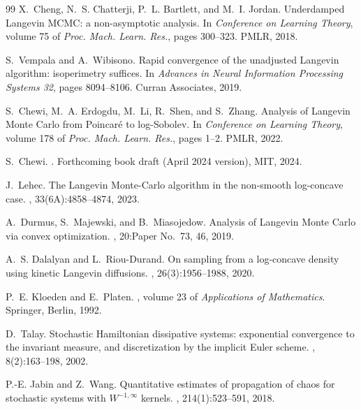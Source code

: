 \documentclass[11pt]{article}
\theoremstyle{definition}
\begin{document}
\begin{thebibliography}{99}
X.~Cheng, N.~S. Chatterji, P.~L. Bartlett, and M.~I. Jordan.
\newblock Underdamped {L}angevin {MCMC}: a non-asymptotic analysis.
\newblock In {\em Conference on Learning Theory}, volume 75 of {\em Proc. Mach. Learn. Res.}, pages 300--323. PMLR, 2018.

S.~Vempala and A.~Wibisono.
\newblock Rapid convergence of the unadjusted {L}angevin algorithm: isoperimetry suffices.
\newblock In {\em Advances in Neural Information Processing Systems 32}, pages 8094--8106. Curran Associates, 2019.

S.~Chewi, M.~A. Erdogdu, M.~Li, R.~Shen, and S.~Zhang.
\newblock Analysis of {L}angevin {M}onte {C}arlo from {P}oincar\'e to log-{S}obolev.
\newblock In {\em Conference on Learning Theory}, volume 178 of {\em Proc. Mach. Learn. Res.}, pages 1--2. PMLR, 2022.

S.~Chewi.
.
\newblock Forthcoming book draft (April 2024 version), MIT, 2024.

J.~Lehec.
\newblock The {L}angevin {M}onte-{C}arlo algorithm in the non-smooth log-concave case.
, 33(6A):4858--4874, 2023.

A.~Durmus, S.~Majewski, and B.~Miasojedow.
\newblock Analysis of {L}angevin {M}onte {C}arlo via convex optimization.
, 20:Paper No.~73, 46, 2019.

A.~S. Dalalyan and L.~Riou-Durand.
\newblock On sampling from a log-concave density using kinetic {L}angevin diffusions.
, 26(3):1956--1988, 2020.

P.~E. Kloeden and E.~Platen.
, volume 23 of {\em Applications of Mathematics}.
\newblock Springer, Berlin, 1992.

D.~Talay.
\newblock Stochastic {H}amiltonian dissipative systems: exponential convergence to the invariant measure, and discretization by the implicit {E}uler scheme.
, 8(2):163--198, 2002.

P.-E. Jabin and Z.~Wang.
\newblock Quantitative estimates of propagation of chaos for stochastic systems with $W^{-1,\infty}$ kernels.
, 214(1):523--591, 2018.


\end{thebibliography}
\end{document}
